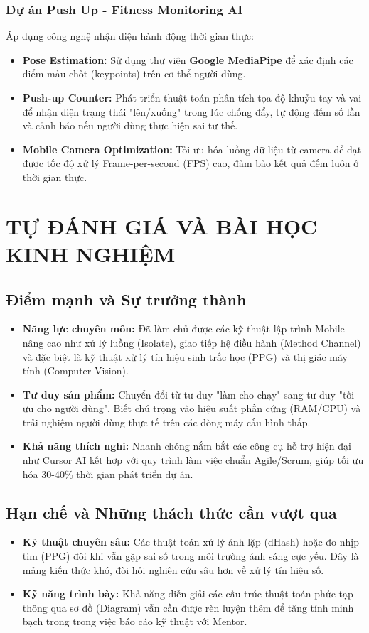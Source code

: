 \documentclass[12pt, a4paper]{article}
\begin{document}
\subsubsection{Dự án Push Up - Fitness Monitoring AI}
Áp dụng công nghệ nhận diện hành động thời gian thực:
\begin{itemize}
    \item \textbf{Pose Estimation:} Sử dụng thư viện \textbf{Google MediaPipe} để xác định các điểm mấu chốt (keypoints) trên cơ thể người dùng.
    \item \textbf{Push-up Counter:} Phát triển thuật toán phân tích tọa độ khuỷu tay và vai để nhận diện trạng thái "lên/xuống" trong lúc chống đẩy, tự động đếm số lần và cảnh báo nếu người dùng thực hiện sai tư thế.
    \item \textbf{Mobile Camera Optimization:} Tối ưu hóa luồng dữ liệu từ camera để đạt được tốc độ xử lý Frame-per-second (FPS) cao, đảm bảo kết quả đếm luôn ở thời gian thực.
\end{itemize}


\section{TỰ ĐÁNH GIÁ VÀ BÀI HỌC KINH NGHIỆM}

\subsection{Điểm mạnh và Sự trưởng thành}
\begin{itemize}
    \item \textbf{Năng lực chuyên môn:} Đã làm chủ được các kỹ thuật lập trình Mobile nâng cao như xử lý luồng (Isolate), giao tiếp hệ điều hành (Method Channel) và đặc biệt là kỹ thuật xử lý tín hiệu sinh trắc học (PPG) và thị giác máy tính (Computer Vision).
    \item \textbf{Tư duy sản phẩm:} Chuyển đổi từ tư duy "làm cho chạy" sang tư duy "tối ưu cho người dùng". Biết chú trọng vào hiệu suất phần cứng (RAM/CPU) và trải nghiệm người dùng thực tế trên các dòng máy cấu hình thấp.
    \item \textbf{Khả năng thích nghi:} Nhanh chóng nắm bắt các công cụ hỗ trợ hiện đại như Cursor AI kết hợp với quy trình làm việc chuẩn Agile/Scrum, giúp tối ưu hóa 30-40\% thời gian phát triển dự án.
\end{itemize}

\subsection{Hạn chế và Những thách thức cần vượt qua}
\begin{itemize}
    \item \textbf{Kỹ thuật chuyên sâu:} Các thuật toán xử lý ảnh lặp (dHash) hoặc đo nhịp tim (PPG) đôi khi vẫn gặp sai số trong môi trường ánh sáng cực yếu. Đây là mảng kiến thức khó, đòi hỏi nghiên cứu sâu hơn về xử lý tín hiệu số.
    \item \textbf{Kỹ năng trình bày:} Khả năng diễn giải các cấu trúc thuật toán phức tạp thông qua sơ đồ (Diagram) vẫn cần được rèn luyện thêm để tăng tính minh bạch trong trong việc báo cáo kỹ thuật với Mentor.
\end{itemize}
\end{document}

